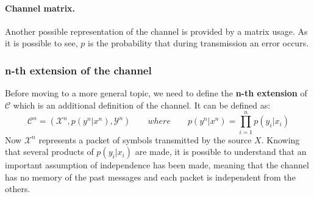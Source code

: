 \paragraph*{Channel matrix.} Another possible representation of the channel is provided by a matrix usage. As it is possible to see, $p$ is the probability that during transmission an error occurs.

\subsubsection{n-th extension of the channel}
Before moving to a more general topic, we need to define the \textbf{n-th extension} of $\mathcal{C}$ which is an additional definition of the channel. It can be defined as:
$$\mathcal{C}^n = (\mathcal{X}^n, p(y^n|x^n), \mathcal{Y}^n) \qquad where \qquad p(y^n|x^n) = \prod_{i=1}^n p(y_i| x_i)$$
Now $\mathcal{X}^n$  represents a packet of symbols transmitted by the source $X$. 
Knowing that several products of $p(y_i| x_i)$ are made, it is possible to understand that an important assumption of independence has been made, meaning that the channel has no memory of the past messages and each packet is independent from the others.

